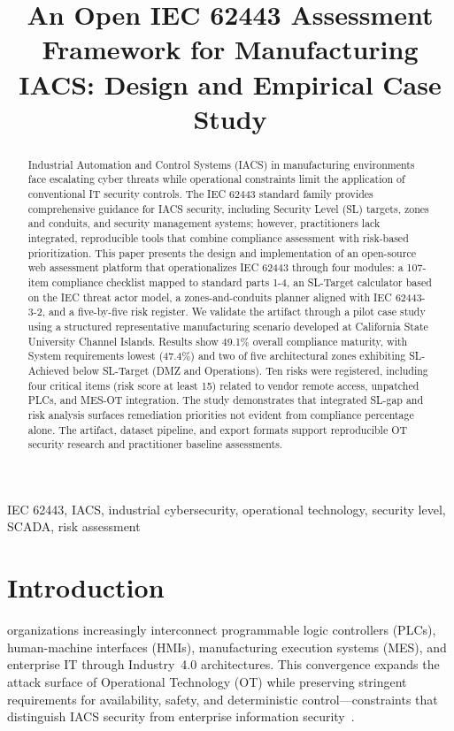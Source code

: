 \documentclass[10pt,conference]{IEEEtran}
\title{An Open IEC 62443 Assessment Framework for Manufacturing IACS: Design and Empirical Case Study}
\author{
\IEEEauthorblockN{Yashwanth Sai Tirukkovalluru}
\IEEEauthorblockA{\textit{California State University Channel Islands} \\
Email: yashwanthsai.tirukkovalluru058@myci.csuci.edu}
}
\begin{document}
\pagestyle{plain}

\maketitle

\begin{abstract}
Industrial Automation and Control Systems (IACS) in manufacturing environments face escalating cyber threats while operational constraints limit the application of conventional IT security controls. The IEC 62443 standard family provides comprehensive guidance for IACS security, including Security Level (SL) targets, zones and conduits, and security management systems; however, practitioners lack integrated, reproducible tools that combine compliance assessment with risk-based prioritization. This paper presents the design and implementation of an open-source web assessment platform that operationalizes IEC 62443 through four modules: a 107-item compliance checklist mapped to standard parts 1-4, an SL-Target calculator based on the IEC threat actor model, a zones-and-conduits planner aligned with IEC 62443-3-2, and a five-by-five risk register. We validate the artifact through a pilot case study using a structured representative manufacturing scenario developed at California State University Channel Islands. Results show 49.1\% overall compliance maturity, with System requirements lowest (47.4\%) and two of five architectural zones exhibiting SL-Achieved below SL-Target (DMZ and Operations). Ten risks were registered, including four critical items (risk score at least 15) related to vendor remote access, unpatched PLCs, and MES-OT integration. The study demonstrates that integrated SL-gap and risk analysis surfaces remediation priorities not evident from compliance percentage alone. The artifact, dataset pipeline, and export formats support reproducible OT security research and practitioner baseline assessments.
\end{abstract}

\begin{IEEEkeywords}
IEC 62443, IACS, industrial cybersecurity, operational technology, security level, SCADA, risk assessment
\end{IEEEkeywords}

\section{Introduction}
 organizations increasingly interconnect programmable logic controllers (PLCs), human-machine interfaces (HMIs), manufacturing execution systems (MES), and enterprise IT through Industry~4.0 architectures. This convergence expands the attack surface of Operational Technology (OT) while preserving stringent requirements for availability, safety, and deterministic control---constraints that distinguish IACS security from enterprise information security~\cite{stouffer2023nist825}.
\end{document}
